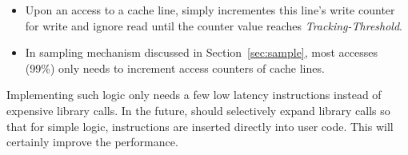 \begin{itemize}
\item
Upon an access to a cache line, 
\Predator{} simply incrementes this line's write counter for write and
ignore read until the counter value reaches {\it Tracking-Threshold}. 
\item
In sampling mechanism discussed in Section~\ref{sec:sample}, 
most accesses (99\%) only needs to increment access counters of cache lines.
\end{itemize}

Implementing such logic only needs a few low latency instructions instead of expensive
library calls. In the future, \Predator{} should 
selectively expand library calls so that for simple logic, instructions are inserted 
directly into user code. This will certainly improve the performance.

